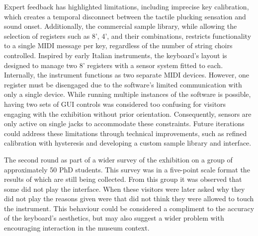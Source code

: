 Expert feedback has highlighted limitations, including imprecise key
calibration, which creates a temporal disconnect between the tactile plucking
sensation and sound onset. Additionally, the commercial sample library, while
allowing the selection of registers such as 8', 4', and their combinations,
restricts functionality to a single MIDI message per key, regardless of the
number of string choirs controlled. Inspired by early Italian instruments, the
keyboard's layout is designed to manage two 8' registers with a sensor system
fitted to each. Internally, the instrument functions as two separate MIDI
devices. However, one register must be disengaged due to the software's limited
communication with only a single device. While running multiple instances of the
software is possible, having two sets of GUI controls was considered too
confusing for visitors engaging with the exhibition without prior orientation.
Consequently, sensors are only active on single jacks to accommodate these
constraints. Future iterations could address these limitations through technical
improvements, such as refined calibration with hysteresis and developing a
custom sample library and interface.

The second round as part of a wider survey of the exhibition on a group of approximately 50 PhD students. This survey was in a five-point scale format the results of which are still being collected. From this group it was observed that some did not play the interface. When these visitors were later asked why they did not play the reasons given were that did not think they were allowed to touch the instrument. This behaviour could be considered a compliment to the accuracy of the keyboard's aesthetics, but may also suggest a wider problem with encouraging interaction in the museum context.


